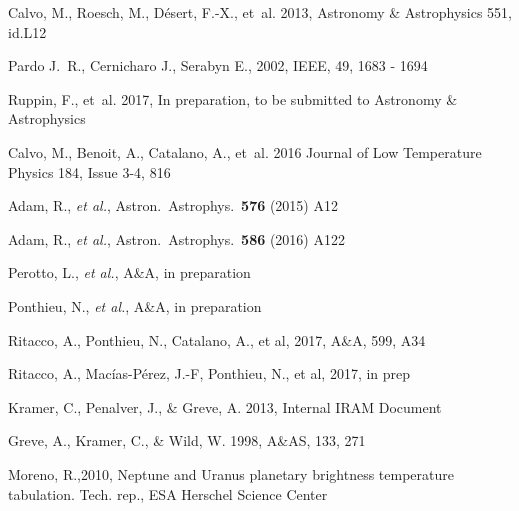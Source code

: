 \begin{thebibliography}{99}
Calvo, M., Roesch, M., D\'esert, F.-X., {et~al.} 2013, 
Astronomy \& Astrophysics 551, id.L12

Pardo J.~R., Cernicharo J., Serabyn E., 2002, 
IEEE, 49, 1683 - 1694

Ruppin, F., {et~al.} 2017, 
In preparation, to be submitted to Astronomy \& Astrophysics

Calvo, M., Benoit, A., Catalano, A., {et~al.} 2016
Journal of Low Temperature Physics 184, Issue 3-4, 816

Adam, R.,  {\it et al.},
  Astron.\ Astrophys.\  {\bf 576} (2015) A12
  
  
Adam, R.,  {\it et al.},
  Astron.\ Astrophys.\  {\bf 586} (2016) A122

    
Perotto, L., {\it et al.}, A\&A, in preparation

Ponthieu, N., {\it et al.}, A\&A, in preparation

Ritacco, A., Ponthieu, N., Catalano, A., et al, 2017, A\&A, 599, A34

Ritacco, A., Mac\'ias-P\'erez, J.-F, Ponthieu, N., et al, 2017, in prep


Kramer, C., Penalver, J., \& Greve, A. 2013, Internal IRAM Document

Greve, A., Kramer, C., \& Wild, W. 1998, A\&AS, 133, 271
 
Moreno, R.,2010, Neptune and Uranus planetary brightness temperature tabulation. Tech. rep., ESA Herschel Science Center


\end{thebibliography}

